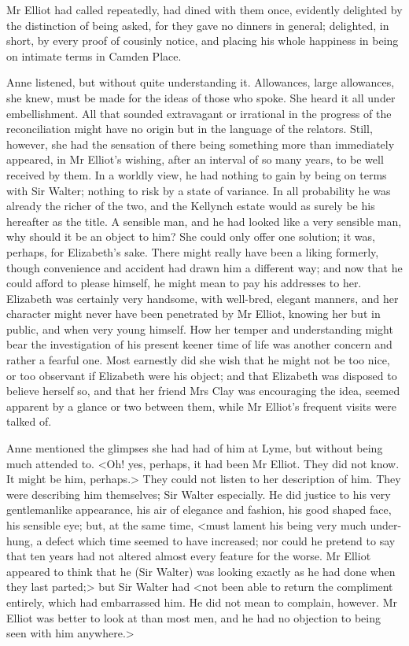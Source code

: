 Mr Elliot had called repeatedly, had dined with them once, evidently delighted by the distinction of being asked, for they gave no dinners in general; delighted, in short, by every proof of cousinly notice, and placing his whole happiness in being on intimate terms in Camden Place.

Anne listened, but without quite understanding it. Allowances, large allowances, she knew, must be made for the ideas of those who spoke. She heard it all under embellishment. All that sounded extravagant or irrational in the progress of the reconciliation might have no origin but in the language of the relators. Still, however, she had the sensation of there being something more than immediately appeared, in Mr Elliot's wishing, after an interval of so many years, to be well received by them. In a worldly view, he had nothing to gain by being on terms with Sir Walter; nothing to risk by a state of variance. In all probability he was already the richer of the two, and the Kellynch estate would as surely be his hereafter as the title. A sensible man, and he had looked like a very sensible man, why should it be an object to him? She could only offer one solution; it was, perhaps, for Elizabeth's sake. There might really have been a liking formerly, though convenience and accident had drawn him a different way; and now that he could afford to please himself, he might mean to pay his addresses to her. Elizabeth was certainly very handsome, with well-bred, elegant manners, and her character might never have been penetrated by Mr Elliot, knowing her but in public, and when very young himself. How her temper and understanding might bear the investigation of his present keener time of life was another concern and rather a fearful one. Most earnestly did she wish that he might not be too nice, or too observant if Elizabeth were his object; and that Elizabeth was disposed to believe herself so, and that her friend Mrs Clay was encouraging the idea, seemed apparent by a glance or two between them, while Mr Elliot's frequent visits were talked of.

Anne mentioned the glimpses she had had of him at Lyme, but without being much attended to. <Oh! yes, perhaps, it had been Mr Elliot. They did not know. It might be him, perhaps.> They could not listen to her description of him. They were describing him themselves; Sir Walter especially. He did justice to his very gentlemanlike appearance, his air of elegance and fashion, his good shaped face, his sensible eye; but, at the same time, <must lament his being very much under-hung, a defect which time seemed to have increased; nor could he pretend to say that ten years had not altered almost every feature for the worse. Mr Elliot appeared to think that he (Sir Walter) was looking exactly as he had done when they last parted;> but Sir Walter had <not been able to return the compliment entirely, which had embarrassed him. He did not mean to complain, however. Mr Elliot was better to look at than most men, and he had no objection to being seen with him anywhere.>

